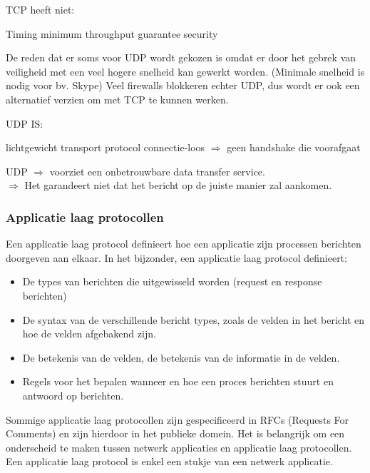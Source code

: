 \noindent TCP heeft niet:

\bi
\itf Timing
\itf minimum throughput guarantee
\itf security
\ei


De reden dat er soms voor UDP wordt gekozen is omdat er door het gebrek van veiligheid met een veel hogere snelheid kan gewerkt worden. (Minimale snelheid is nodig voor bv. Skype) Veel firewalls blokkeren echter UDP, dus wordt er ook een alternatief verzien om met TCP te kunnen werken.

UDP IS:

\bi
\itf lichtgewicht transport protocol
\itf connectie-loos $\Rightarrow$ geen handshake die voorafgaat 
\ei

\noindent UDP $\Rightarrow$ voorziet een onbetrouwbare data transfer service.\\
$\Rightarrow$ Het garandeert niet dat het bericht op de juiste manier zal aankomen.\\

\subsubsection{Applicatie laag protocollen}

Een applicatie laag protocol definieert hoe een applicatie zijn processen berichten doorgeven aan elkaar. In het bijzonder, een applicatie laag protocol definieert:
\begin{itemize}
    \item De types van berichten die uitgewisseld worden (request en response berichten)
    \item De syntax van de verschillende bericht types, zoals de velden in het bericht en hoe de velden afgebakend zijn.
    \item De betekenis van de velden, de betekenis van de informatie in de velden.
    \item Regels voor het bepalen wanneer en hoe een proces berichten stuurt en antwoord op berichten.
\end{itemize}
Sommige applicatie laag protocollen zijn gespecificeerd in RFCs (Requests For Comments) en zijn hierdoor in het publieke domein. Het is belangrijk om een onderscheid te maken tussen netwerk applicaties en applicatie laag protocollen. Een applicatie laag protocol is enkel een stukje van een netwerk applicatie.
